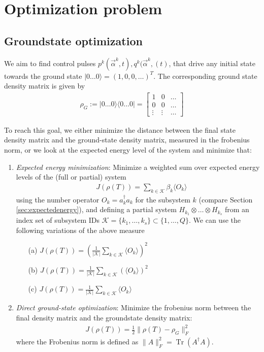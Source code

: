 \documentclass[letterpaper]{article}
\DeclareMathOperator{\Tr}{Tr}
\begin{document}
\section{Optimization problem}

\subsection{Groundstate optimization}
We aim to find control pulses $p^k(\vec{\alpha}^k, t), q^k(\vec{\alpha}^k, (t)$,
that drive any initial state towards the ground state $|0\dots 0\rangle = (1, 0,
0, \dots )^T$. The corresponding ground state density matrix is given by
\begin{align}
  \rho_{G} := |0\dots 0\rangle \langle 0 \dots 0 | = 
  \begin{bmatrix} 1      & 0      &  \dots   \\ 
                  0      & 0      &  \dots  \\ 
                  \vdots & \vdots &  \dots 
  \end{bmatrix}
\end{align}

To reach this goal, we either minimize the distance between the final state
density matrix and the ground-state density matrix, measured in the frobenius
norm, or we look at the expected energy level of the system and minimize that:
\begin{enumerate}
  \item \textit{Expected energy minimization}: Minimize a weighted sum over
    expected energy levels of the (full or partial) system
    \begin{align}
       \quad J(\rho(T)) = \sum_{k\in \mathcal{K}} \beta_k \langle O_k \rangle 
    \end{align}
    using the number operator $O_k = a_k^\dag a_k$ for the subsystem $k$
    (compare Section \ref{sec:expectedenergy}), and defining a partial system
    $H_{k_1}\otimes \dots \otimes H_{k_s}$ from an index set of subsystem IDs
    $\mathcal{K}=\{k_1,\dots,k_s\}\subset \{1,\dots,Q\}$. We can use the
    following variations of the above measure
    \begin{enumerate}
      \item[(a)] $J(\rho(T)) =
        \left(\frac{1}{|\mathcal{K}|}\sum_{k\in\mathcal{K}}\langle O_k \rangle
        \right)^2$
      \item[(b)] $J(\rho(T)) =
        \frac{1}{|\mathcal{K}|}\sum_{k\in\mathcal{K}}\left(\langle O_k \rangle
        \right)^2 $
      \item[(c)] $J(\rho(T)) =
        \frac{1}{|\mathcal{K}|}\sum_{k\in\mathcal{K}}\langle O_k \rangle$
    \end{enumerate}
  \item \textit{Direct ground-state optimization}: Minimize the frobenius norm
    between the final density matrix and the groundstate density matrix:
    \begin{align}
      J(\rho(T)) = \frac 12 \| \rho(T) - \rho_G \|^2_F 
    \end{align}
    where the Frobenius norm is defined as $\|A\|^2_F = \Tr(A^{\dagger}A)$.

\end{enumerate}
\end{document}
